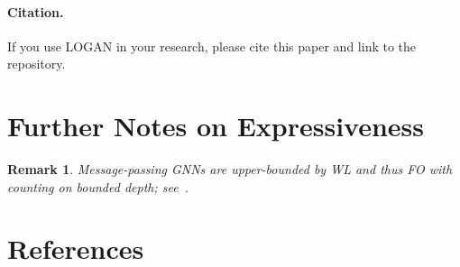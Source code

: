 \documentclass{article}
\newtheorem{remark}[theorem]{Remark}
\begin{document}
\paragraph{Citation.}
If you use LOGAN in your research, please cite this paper and link to the repository.

\section{Further Notes on Expressiveness}
\begin{remark}
Message-passing GNNs are upper-bounded by WL and thus FO with counting on bounded depth; see~\cite{xu2018powerful,morris2019weisfeiler,immerman1999descriptive,libkin2004elements,grohe2017descriptive}.
\end{remark}

\section*{References}
\end{document}
